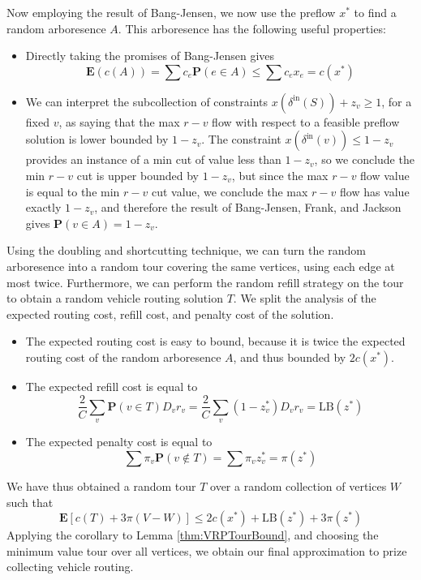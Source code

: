 \documentclass{article}
\theoremstyle{plain}
\begin{document}
Now employing the result of Bang-Jensen, we now use the preflow $x^*$ to find a random arboresence $A$. This arboresence has the following useful properties:
%
\begin{itemize}
    \item Directly taking the promises of Bang-Jensen gives
    \[ \mathbf{E}(c(A)) = \sum c_e \mathbf{P}(e \in A) \leq \sum c_e x_e = c(x^*) \]

    \item We can interpret the subcollection of constraints $x(\delta^{\text{in}}(S)) + z_v \geq 1$, for a fixed $v$, as saying that the max $r-v$ flow with respect to a feasible preflow solution is lower bounded by $1 - z_v$. The constraint $x(\delta^{\text{in}}(v)) \leq 1 - z_v$ provides an instance of a min cut of value less than $1 - z_v$, so we conclude the min $r-v$ cut is upper bounded by $1 - z_v$, but since the max $r-v$ flow value is equal to the min $r-v$ cut value, we conclude the max $r-v$ flow has value exactly $1 - z_v$, and therefore the result of Bang-Jensen, Frank, and Jackson gives $\mathbf{P}(v \in A) = 1 - z_v$.

\end{itemize}

Using the doubling and shortcutting technique, we can turn the random arboresence into a random tour covering the same vertices, using each edge at most twice. Furthermore, we can perform the random refill strategy on the tour to obtain a random vehicle routing solution $T$. We split the analysis of the expected routing cost, refill cost, and penalty cost of the solution.
%
\begin{itemize}
    \item The expected routing cost is easy to bound, because it is twice the expected routing cost of the random arboresence $A$, and thus bounded by $2c(x^*)$.

    \item The expected refill cost is equal to
    \[ \frac{2}{C} \sum_v \mathbf{P}(v \in T) D_v r_v = \frac{2}{C} \sum_v (1 - z^*_v) D_vr_v = \text{LB}(z^*) \]

    \item The expected penalty cost is equal to
    \[ \sum \pi_v \mathbf{P}(v \not \in T) = \sum \pi_vz^*_v = \pi(z^*) \]
\end{itemize}
%
We have thus obtained a random tour $T$ over a random collection of vertices $W$ such that
%
\[ \mathbf{E}[c(T) + 3\pi(V - W)] \leq 2c(x^*) + \text{LB}(z^*) + 3\pi(z^*) \]
%
Applying the corollary to Lemma \ref{thm:VRPTourBound}, and choosing the minimum value tour over all vertices, we obtain our final approximation to prize collecting vehicle routing.
\end{document}
